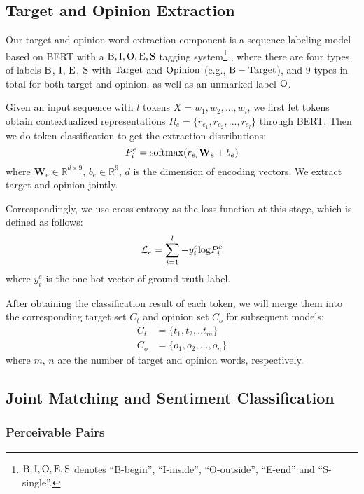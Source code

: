 \documentclass[11pt]{article}
\begin{document}
\subsection{Target and Opinion Extraction}
Our target and opinion word extraction component is a sequence labeling model based on BERT \cite{devlin2018bert} with a $\rm B, I, O, E, S$ tagging system\footnote{$\rm B, I, O, E, S$ denotes ``B-begin'', ``I-inside'', ``O-outside'', ``E-end'' and ``S-single''.} , where there are four types of labels $\rm B$, $\rm I$, $\rm E$, $\rm S$ with $\rm Target$ and $\rm Opinion$ (e.g., $\rm B-Target$), and 9 types in total for both target and opinion, as well as an unmarked label $\rm O$. 

Given an input sequence with $l$ tokens $X=w_1, w_2, ..., w_l$, we first let tokens obtain contextualized representations $R_e=\{r_{e_1}, r_{e_2}, ..., r_{e_l}\}$ through BERT. Then we do token classification to get the extraction distributions:
\begin{equation}
P^e_i = {\rm softmax}(r_{e_i}\textbf{W}_e+b_e)
\end{equation}
where $\textbf{W}_e\in \mathbb{R}^{d\times 9}$, $b_e \in \mathbb{R}^{9} $, $d$ is the dimension of encoding vectors. We extract target and opinion jointly. 

Correspondingly, we use cross-entropy as the loss function at this stage, which is defined as follows:
\begin{equation}
    \mathcal{L}_e = \sum_{i=1}^l -y^e_i{\rm log}P^e_i
\end{equation}
where 
$y^e_i$ is the one-hot vector of ground truth label.

After obtaining the classification result of each token, we will merge them into the corresponding target set $C_t$ and opinion set $C_o$ for subsequent models:
\begin{equation}
    \begin{aligned}
    C_t&=\{t_1, t_2, .. t_m\} \\
    C_o&=\{o_1, o_2, ..., o_n\}
    \end{aligned}
\end{equation}
where $m$, $n$ are the number of target and opinion words, respectively.

\subsection{Joint Matching and Sentiment Classification}

\subsubsection{Perceivable Pairs}
\end{document}
